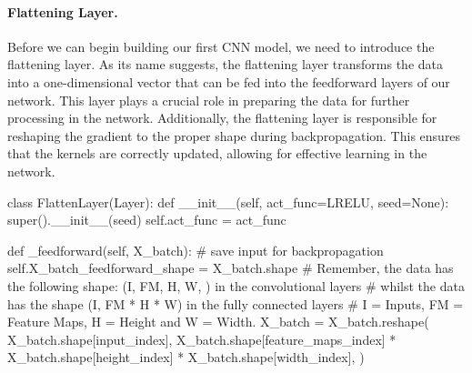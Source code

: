 \documentclass[%
oneside,                 %
final,                   %
10pt]{article}
\begin{document}
\epycod


\paragraph{Flattening Layer.}
Before we can begin building our first CNN model, we need to introduce
the flattening layer. As its name suggests, the flattening layer
transforms the data into a one-dimensional vector that can be fed into
the feedforward layers of our network. This layer plays a crucial role
in preparing the data for further processing in the
network. Additionally, the flattening layer is responsible for
reshaping the gradient to the proper shape during
backpropagation. This ensures that the kernels are correctly updated,
allowing for effective learning in the network.






















































\bpycod
class FlattenLayer(Layer):
    def __init__(self, act_func=LRELU, seed=None):
        super().__init__(seed)
        self.act_func = act_func

    def _feedforward(self, X_batch):
        # save input for backpropagation
        self.X_batch_feedforward_shape = X_batch.shape
        # Remember, the data has the following shape: (I, FM, H, W, ) in the convolutional layers
        # whilst the data has the shape (I, FM * H * W) in the fully connected layers
        # I = Inputs, FM = Feature Maps, H = Height and W = Width.
        X_batch = X_batch.reshape(
            X_batch.shape[input_index],
            X_batch.shape[feature_maps_index]
            * X_batch.shape[height_index]
            * X_batch.shape[width_index],
        )
\end{document}
